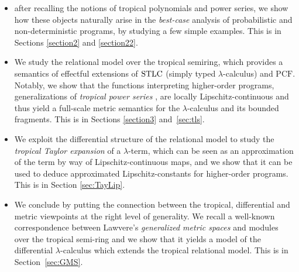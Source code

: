 \begin{itemize}

\item after recalling the notions of tropical polynomials and power series, we show how these objects naturally arise in the \emph{best-case} analysis of probabilistic and non-deterministic programs, by studying a few simple examples. This is in Sections \ref{section2} and \ref{section22}.

\item We study the relational model over the tropical semiring, which provides a semantics of effectful extensions of $\mathrm{STLC}$ (simply typed $\lambda$-calculus) and $\mathrm{PCF}$. Notably, 
 we show that the functions interpreting higher-order programs, %
generalizations of \emph{tropical power series} \cite{Porzio2021}, are locally Lipschitz-continuous and thus yield a full-scale metric semantics for the $\lambda$-calculus and its bounded fragments. This is in Sections \ref{section3} and~\ref{sec:tls}.
 
 \item We exploit the differential structure of the relational model to study the \emph{tropical Taylor expansion} of a $\lambda$-term, which can be seen as an approximation of the term by way of Lipschitz-continuous maps, and we show that it can be used to deduce approximated Lipschitz-constants for higher-order programs.
This is in Section \ref{sec:TayLip}.



\item We conclude 
by putting the connection between the 
tropical, differential and metric viewpoints at the right level of generality.
We recall a well-known correspondence between Lawvere's \emph{generalized metric spaces} \cite{Lawvere1973, Stubbe2014} and modules over the tropical semi-ring \cite{Russo2007} and we show that it yields a model of the differential $\lambda$-calculus which extends the tropical relational model. This is in Section~\ref{sec:GMS}.
\end{itemize}
%
%
%
%
%
%
%
%
%


